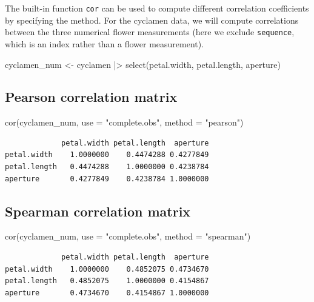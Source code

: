 \documentclass[
  a4paper,
  DIV=11,
  numbers=noendperiod,
  oneside]{scrreprt}
\newenvironment{Shaded}{\begin{snugshade}}{\end{snugshade}}
\newcommand{\AttributeTok}[1]{\textcolor[rgb]{0.40,0.45,0.13}{#1}}
\newcommand{\FunctionTok}[1]{\textcolor[rgb]{0.28,0.35,0.67}{#1}}
\newcommand{\NormalTok}[1]{\textcolor[rgb]{0.00,0.23,0.31}{#1}}
\newcommand{\OtherTok}[1]{\textcolor[rgb]{0.00,0.23,0.31}{#1}}
\newcommand{\SpecialCharTok}[1]{\textcolor[rgb]{0.37,0.37,0.37}{#1}}
\newcommand{\StringTok}[1]{\textcolor[rgb]{0.13,0.47,0.30}{#1}}
\theoremstyle{plain}
\theoremstyle{definition}
\theoremstyle{definition}
\theoremstyle{definition}
\theoremstyle{plain}
\theoremstyle{remark}
\begin{document}
The built-in function \texttt{cor} can be used to compute different
correlation coefficients by specifying the method. For the cyclamen
data, we will compute correlations between the three numerical flower
measurements (here we exclude \texttt{sequence}, which is an index
rather than a flower measurement).

\begin{Shaded}
\begin{Highlighting}[]
\NormalTok{cyclamen\_num }\OtherTok{\textless{}{-}}\NormalTok{ cyclamen }\SpecialCharTok{|\textgreater{}}
    \FunctionTok{select}\NormalTok{(petal.width, petal.length, aperture)}
\end{Highlighting}
\end{Shaded}

\subsection{Pearson correlation
matrix}\label{pearson-correlation-matrix}

\begin{Shaded}
\begin{Highlighting}[]
\FunctionTok{cor}\NormalTok{(cyclamen\_num, }\AttributeTok{use =} \StringTok{"complete.obs"}\NormalTok{, }\AttributeTok{method =} \StringTok{"pearson"}\NormalTok{)}
\end{Highlighting}
\end{Shaded}

\begin{verbatim}
             petal.width petal.length  aperture
petal.width    1.0000000    0.4474288 0.4277849
petal.length   0.4474288    1.0000000 0.4238784
aperture       0.4277849    0.4238784 1.0000000
\end{verbatim}

\subsection{Spearman correlation
matrix}\label{spearman-correlation-matrix}

\begin{Shaded}
\begin{Highlighting}[]
\FunctionTok{cor}\NormalTok{(cyclamen\_num, }\AttributeTok{use =} \StringTok{"complete.obs"}\NormalTok{, }\AttributeTok{method =} \StringTok{"spearman"}\NormalTok{)}
\end{Highlighting}
\end{Shaded}

\begin{verbatim}
             petal.width petal.length  aperture
petal.width    1.0000000    0.4852075 0.4734670
petal.length   0.4852075    1.0000000 0.4154867
aperture       0.4734670    0.4154867 1.0000000
\end{verbatim}
\end{document}
